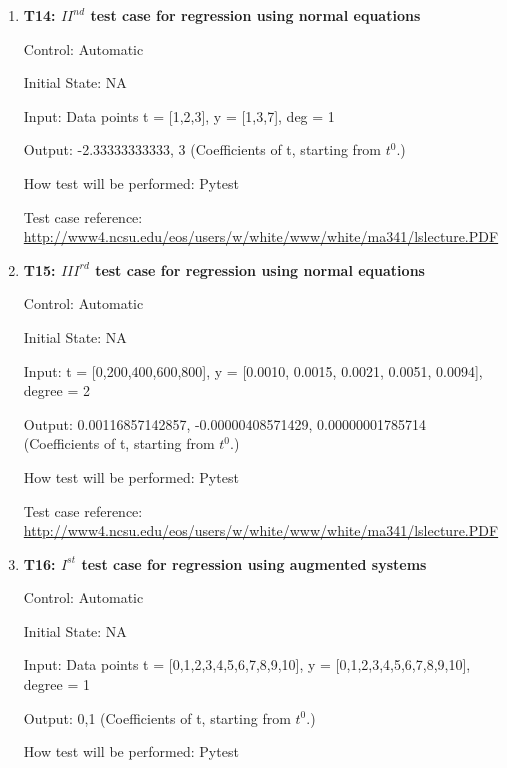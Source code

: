 \documentclass[12pt, titlepage]{article}
\begin{document}
\begin{enumerate}

\item{\textbf{T14: ${II}^{nd}$ test case for regression using normal equations}\\}

Control: Automatic

Initial State: NA

Input: Data points t = [1,2,3], y = [1,3,7], deg = 1

Output: -2.33333333333, 3 (Coefficients of t, starting from $t^{0}$.)

How test will be performed: Pytest

Test case reference: \url{http://www4.ncsu.edu/eos/users/w/white/www/white/ma341/lslecture.PDF}\\


\item{\textbf{T15: ${III}^{rd}$ test case for regression using normal equations }\\}

Control: Automatic

Initial State: NA

Input: t = [0,200,400,600,800], y = [0.0010, 0.0015, 0.0021, 0.0051, 0.0094], degree = 2

Output: 0.00116857142857, -0.00000408571429, 0.00000001785714 (Coefficients of t, starting from $t^{0}$.)

How test will be performed: Pytest

Test case reference: \url{http://www4.ncsu.edu/eos/users/w/white/www/white/ma341/lslecture.PDF}\\




\item{\textbf{T16: $I^{st}$ test case for regression using augmented systems}\\}

Control: Automatic

Initial State: NA

Input: Data points t = [0,1,2,3,4,5,6,7,8,9,10], y = [0,1,2,3,4,5,6,7,8,9,10], degree = 1 

Output: 0,1 (Coefficients of t, starting from $t^{0}$.)

How test will be performed: Pytest\\


\end{enumerate}
\end{document}
